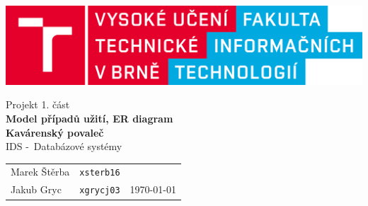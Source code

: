 \documentclass[a4paper, 11pt]{article}
\begin{document}
\begin{titlepage}
		\begin{center}
			\includegraphics[width=0.85\linewidth]{./logo_cz.png} \\


			\LARGE{Projekt 1. část} \\
			\Huge{\textbf{Model případů užití, ER diagram}} \\
            \bigskip
            \Large{\textbf{Kavárenský povaleč}} \\
            \Large{IDS \--\ Databázové systémy} \\
            
		\end{center}

			\Large

   
            \begin{tabularx}{0.96\textwidth}{ll>{\raggedleft\arraybackslash}X}
                Marek Štěrba & \texttt{xsterb16} \\
                Jakub Gryc & \texttt{xgrycj03} &  \Large\today  \\
			\end{tabularx}


	\end{titlepage}
\end{document}
